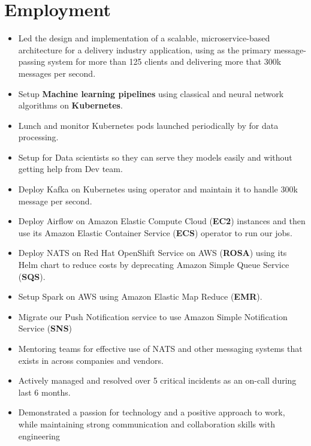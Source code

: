 \section{Employment}

\begin{itemize}
      \item Led the design and implementation of a scalable, microservice-based architecture for a delivery industry application,
            using  as the primary message-passing system for more than 125 clients and delivering
            more that 300k messages per second.
      \item Setup \textbf{Machine learning pipelines} using classical and neural network algorithms on \textbf{Kubernetes}.
      \item Lunch and monitor Kubernetes pods launched periodically by  for data processing.
      \item Setup  for Data scientists so they can serve they models easily and without getting help from Dev team.
      \item Deploy Kafka on Kubernetes using  operator and maintain it to handle 300k message per second.
      \item Deploy Airflow on Amazon Elastic Compute Cloud (\textbf{EC2}) instances and then use its Amazon Elastic Container Service (\textbf{ECS}) operator to run our jobs.
      \item Deploy NATS on Red Hat OpenShift Service on AWS (\textbf{ROSA})
            using its Helm chart to reduce costs by deprecating Amazon Simple Queue Service (\textbf{SQS}).
      \item Setup Spark on AWS using Amazon Elastic Map Reduce (\textbf{EMR}).
      \item Migrate our Push Notification service to use Amazon Simple Notification Service (\textbf{SNS})
      \item Mentoring teams for effective use of NATS and other messaging systems that exists in across companies and vendors.
      \item Actively managed and resolved over 5 critical incidents as an on-call during last 6 months.
      \item Demonstrated a passion for technology and a positive approach to work,
            while maintaining strong communication and collaboration skills with engineering

\end{itemize}
